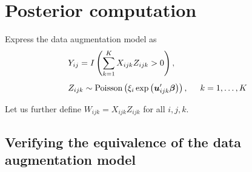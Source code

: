 \documentclass[11pt]{article}
\renewcommand{\vec}{\boldsymbol}
\newcommand{\ind}{I}
\begin{document}
\vspace{2.54cm} \section{Posterior computation}

Express the data augmentation model as
\begin{align} \label{eq: Data augmentation model}
& Y_{ij} = \ind \left( \sum_{k=1}^K X_{ijk} Z_{ijk} > 0 \right), \nonumber \\[1ex]
& Z_{ijk} \sim \text{Poisson}\left( \xi_i \exp\left( \vec{u}_{ijk}^\prime \vec{\beta} \right)\right), \hspace{5mm}  k=1,\dots,K
\end{align} \vspace{0mm}

Let us further define $W_{ijk} = X_{ijk} Z_{ijk}$ for all $i,j,k$.


\subsection{Verifying the equivalence of the data augmentation model}
\end{document}
